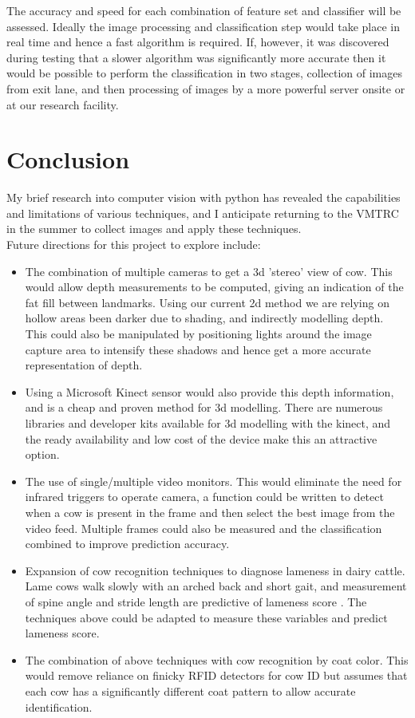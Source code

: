 \documentclass[11pt]{article}
\begin{document}
	The accuracy and speed for each combination of feature set and classifier will be assessed.
	Ideally the image processing and classification step would take place in real time and hence a fast algorithm is required. 
	If, however, it was discovered during testing that a slower algorithm was significantly more accurate then it would be possible to perform the classification in two stages, collection of images from exit lane, and then processing of images by a more powerful server onsite or at our research facility. 

\newpage
\section{Conclusion}
	My brief research into computer vision with python has revealed the capabilities and limitations of various techniques, and I anticipate returning to the VMTRC in the summer to collect images and apply these techniques.\\

	Future directions for this project to explore include:
	\begin{itemize}
		\item The combination of multiple cameras to get a 3d 'stereo' view of cow. This would allow depth measurements to be computed, giving an indication of the fat fill between landmarks.
			Using our current 2d method we are relying on hollow areas been darker due to shading, and indirectly modelling depth.
			This could also be manipulated by positioning lights around the image capture area to intensify these shadows and hence get a more accurate representation of depth.
		\item Using a Microsoft Kinect sensor would also provide this depth information, and is a cheap and proven method for 3d modelling.
			There are numerous libraries and developer kits available for 3d modelling with the kinect, and the ready availability and low cost of the device make this an attractive option.
		\item The use of single/multiple video monitors. This would eliminate the need for infrared triggers to operate camera, a function could be written to detect when a cow is present in the frame and then select the best image from the video feed. Multiple frames could also be measured and the classification combined to improve prediction accuracy.
		\item Expansion of cow recognition techniques to diagnose lameness in dairy cattle. Lame cows walk slowly with an arched back and short gait, and measurement of spine angle and stride length are predictive of lameness score \cite{Viazzi2013,Pluk2012}. The techniques above could be adapted to measure these variables and predict lameness score.
		\item The combination of above techniques with cow recognition by coat color. This would remove reliance on finicky RFID detectors for cow ID but assumes that each cow has a significantly different coat pattern to allow accurate identification.
	\end{itemize}
\end{document}
